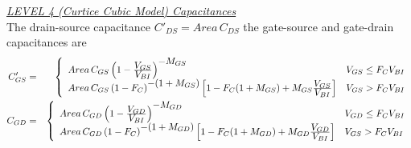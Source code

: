 \noindent\underline{\sl LEVEL 4 (Curtice Cubic Model) Capacitances}\\[0.1in]
The drain-source capacitance
$C'_{DS} = Area\,C_{DS}$\inlineeq
the gate-source and gate-drain capacitances are
\begin{eqnarray}
C'_{GS} &=& \left\{ \begin{array}{ll}
         Area\,C_{GS}\left(1 - {{\textstyle V_{GS}}\over{\textstyle V_{BI}}}
         \right)^{\textstyle -M_{GS}}
         & V_{GS} \le F_C V_{BI}\\
         Area\,C_{GS}\left(1 -F_C\right)^{\textstyle -(1+M_{GS})}
         \left[1-F_C(1+M_{GS})+M_{GS}
          {{\textstyle V_{GS}}\over{\textstyle V_{BI}}} \right]
         & V_{GS} > F_C V_{BI}
         \end{array} \right. \\ %
C_{GD} &=& \left\{ \begin{array}{ll}
         Area\,C_{GD}\left(1 - {{\textstyle V_{GD}}\over{\textstyle V_{BI}}}
         \right)^{\textstyle -M_{GD}}
         & V_{GD} \le F_C V_{BI}\\
         Area\,C_{GD}\left(1 -F_C\right)^{\textstyle -(1+M_{GD})}
         \left[1-F_C(1+M_{GD})+M_{GD}
            {{\textstyle V_{GD}}\over{\textstyle V_{BI}}}
         \right]
         & V_{GS} > F_C V_{BI}
         \end{array} \right.  %
\end{eqnarray}

